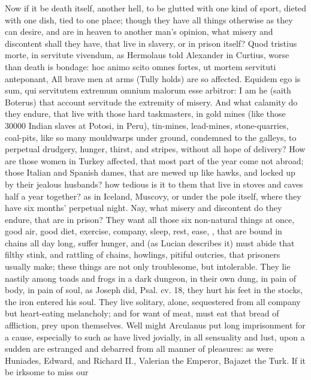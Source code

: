 {{Now if it be death itself, another hell, to be glutted with one kind of
sport, dieted with one dish, tied to one place; though they have all
things otherwise as they can desire, and are in heaven to another man's
opinion, what misery and discontent shall they have, that live in
slavery, or in prison itself? Quod tristius morte, in servitute
vivendum, as Hermolaus told Alexander in Curtius, worse than
death is bondage: hoc animo scito omnes fortes, ut mortem
servituti anteponant, All brave men at arms (Tully holds) are so
affected. Equidem ego is sum, qui servitutem extremum omnium
malorum esse arbitror: I am he (saith Boterus) that account servitude
the extremity of misery. And what calamity do they endure, that live
with those hard taskmasters, in gold mines (like those 30\thinspace{}000
Indian slaves at Potosi, in Peru), tin-mines, lead-mines,
stone-quarries, coal-pits, like so many mouldwarps under ground,
condemned to the galleys, to perpetual drudgery, hunger, thirst, and
stripes, without all hope of delivery? How are those women in Turkey
affected, that most part of the year come not abroad; those Italian and
Spanish dames, that are mewed up like hawks, and locked up by their
jealous husbands? how tedious is it to them that live in stoves and
caves half a year together? as in Iceland, Muscovy, or under the
pole itself, where they have six months' perpetual night. Nay,
what misery and discontent do they endure, that are in prison? They
want all those six non-natural things at once, good air, good diet,
exercise, company, sleep, rest, ease, \etc{}, that are bound in chains all
day long, suffer hunger, and (as Lucian describes it) must abide
that filthy stink, and rattling of chains, howlings, pitiful outcries,
that prisoners usually make; these things are not only troublesome, but
intolerable. They lie nastily among toads and frogs in a dark dungeon,
in their own dung, in pain of body, in pain of soul, as Joseph did,
Psal. cv. 18, they hurt his feet in the stocks, the iron entered his
soul. They live solitary, alone, sequestered from all company but
heart-eating melancholy; and for want of meat, must eat that bread of
affliction, prey upon themselves. Well might Arculanus put long
imprisonment for a cause, especially to such as have lived jovially, in
all sensuality and lust, upon a sudden are estranged and debarred from
all manner of pleasures: as were Huniades, Edward, and Richard II.,
Valerian the Emperor, Bajazet the Turk. If it be irksome to miss our
}}
